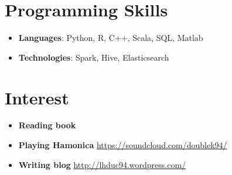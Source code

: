 \documentclass[letterpaper,11pt]{article}
\newcommand{\resumeSubHeadingListStart}{\begin{itemize}[leftmargin=*]}
\newcommand{\resumeSubHeadingListEnd}{\end{itemize}}
\begin{document}
%
\section{Programming Skills}
  \resumeSubHeadingListStart
    \item{
      \textbf{Languages}{: Python, R, C++, Scala, SQL, Matlab}
    }
  	\item{
	  \textbf{Technologies}{: Spark, Hive, Elasticsearch}
  	}
  \resumeSubHeadingListEnd

\section{Interest}
  \resumeSubHeadingListStart
  	\item{
  	  \textbf{Reading book}
  	}
  	\item{
	  \textbf{Playing Hamonica}
	  \href{https://soundcloud.com/doublek94/}{https://soundcloud.com/doublek94/}	
  	}
	\item{
	  \textbf{Writing blog}
	  \href{http://lhduc94.wordpress.com/}{http://lhduc94.wordpress.com/}
	}
  \resumeSubHeadingListEnd

\end{document}
